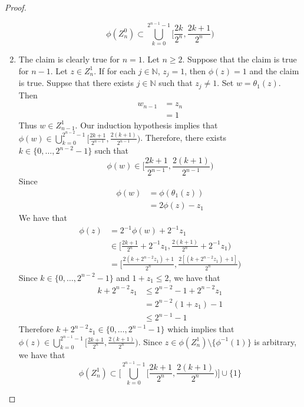 \documentclass{book}
\theoremstyle{definition}
\newcommand{\N}{\mathbb{N}}
\DeclareMathOperator*{\0}{\mbf{0}}
\DeclareMathOperator*{\1}{\mbf{1}}
\begin{document}
\begin{proof}
\begin{enumerate}
			$$\phi(Z_n^0) \subset \bigcup\limits_{k =0}^{2^{n-1} - 1} \bigg[ \frac{2k}{2^n}, \frac{2k+1}{2^n} \bigg)$$
			\item The claim is clearly true for $n =1$. Let $n \geq 2$. Suppose that the claim is true for $n-1$. Let $z \in Z_n^1$. If for each $j \in \N$, $z_j = 1$, then $\phi(z) = 1$ and the claim is true. Suppse that there exists $j \in \N$ such that $z_j \neq 1$. Set $w = \theta_1(z)$. Then 
			\begin{align*}
				w_{n-1} 
				& = z_n \\
				& = 1
			\end{align*} 
			Thus $w \in Z_{n-1}^1$. Our induction hypothesis implies that $\phi(w) \in \bigcup\limits_{k =0}^{2^{n-2} -1} \bigg[ \frac{2k+1}{2^{n-1}}, \frac{2(k+1)}{2^{n-1}} \bigg)$. Therefore, there exists $k \in \{0, \ldots, 2^{n-2} -1\}$ such that $$\phi(w) \in \bigg[ \frac{2k+1}{2^{n-1}}, \frac{2(k+1)}{2^{n-1}} \bigg)$$ Since 
			\begin{align*}
				\phi(w) 
				& = \phi(\theta_1(z)) \\
				& = 2 \phi(z) - z_1
			\end{align*}
			We have that
			\begin{align*}
				\phi(z) 
				& = 2^{-1}\phi(w) + 2^{-1} z_1 \\
				& \in \bigg[ \frac{2k+1}{2^n} + 2^{-1}z_1, \frac{2(k + 1)}{2^n} +  2^{-1}z_1 \bigg) \\
				& = \bigg[ \frac{2(k+ 2^{n-2}z_1) + 1}{2^n}, \frac{2[(k+ 2^{n-2}z_1) + 1]}{2^n} \bigg) 
			\end{align*}
			Since $k \in \{0, \ldots, 2^{n-2} -1\}$ and $1 + z_1 \leq 2$, we have that 
			\begin{align*}
				k+ 2^{n-2}z_1 
				& \leq 2^{n-2} -1 + 2^{n-2}z_1  \\
				&  =  2^{n-2}(1 + z_1) - 1 \\
				& \leq 2^{n-1} - 1
			\end{align*} 
			Therefore $	k+ 2^{n-2}z_1 \in \{0, \ldots, 2^{n-1} - 1\}$ which implies that $\phi(z) \in  \bigcup\limits_{k =0}^{2^{n-1} -1} \bigg[ \frac{2k+1}{2^n}, \frac{2(k+1)}{2^n} \bigg)$. Since $z \in \phi(Z_n^1) \setminus \{\phi^{-1}(1)\}$ is arbitrary, we have that
			$$\phi(Z_n^1 ) \subset \bigg[ \bigcup\limits_{k =0}^{2^{n-1} -1} \bigg[ \frac{2k + 1}{2^n}, \frac{2(k+1)}{2^n} \bigg) \bigg] \cup \{1\}$$
		\end{enumerate}
	\end{proof}
	
	
	
\end{document}
